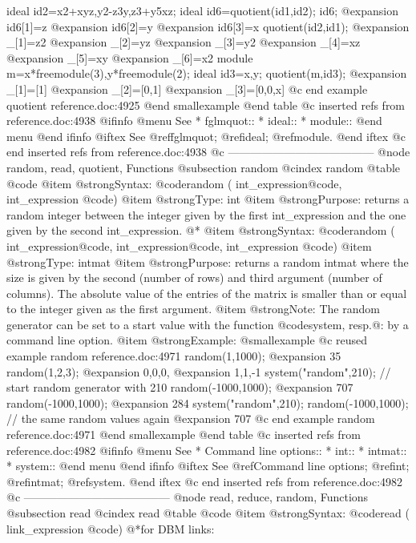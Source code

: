 {{{{{{ideal id2=x2+xyz,y2-z3y,z3+y5xz;
ideal id6=quotient(id1,id2);
id6;
@expansion{} id6[1]=z
@expansion{} id6[2]=y
@expansion{} id6[3]=x
quotient(id2,id1);
@expansion{} _[1]=z2
@expansion{} _[2]=yz
@expansion{} _[3]=y2
@expansion{} _[4]=xz
@expansion{} _[5]=xy
@expansion{} _[6]=x2
module m=x*freemodule(3),y*freemodule(2);
ideal id3=x,y;
quotient(m,id3);
@expansion{} _[1]=[1]
@expansion{} _[2]=[0,1]
@expansion{} _[3]=[0,0,x]
@c end example quotient reference.doc:4925
@end smallexample
@end table
@c inserted refs from reference.doc:4938
@ifinfo
@menu
See
* fglmquot::
* ideal::
* module::
@end menu
@end ifinfo
@iftex
See
@ref{fglmquot};
@ref{ideal};
@ref{module}.
@end iftex
@c end inserted refs from reference.doc:4938
@c ---------------------------------------
@node random, read, quotient, Functions
@subsection random
@cindex random
@table @code
@item @strong{Syntax:}
@code{random (} int_expression@code{,} int_expression @code{)}
@item @strong{Type:}
int
@item @strong{Purpose:}
returns a random integer between the integer given by the first
int_expression and the one given by the second int_expression.
@*
@item @strong{Syntax:}
@code{random (} int_expression@code{,} int_expression@code{,} int_expression @code{)}
@item @strong{Type:}
intmat
@item @strong{Purpose:}
returns a random intmat where the size is given by the second (number of
rows) and third argument (number of columns). The absolute value of the
entries of the matrix is smaller than or equal to the integer given as
the first argument.
@item @strong{Note:}
The random generator can be set to a start value with
the function @code{system}, resp.@: by a command line option.
@item @strong{Example:}
@smallexample
@c reused example random reference.doc:4971 
  random(1,1000);
@expansion{} 35
  random(1,2,3);
@expansion{} 0,0,0,
@expansion{} 1,1,-1 
  system("random",210);  // start random generator with 210
  random(-1000,1000);
@expansion{} 707
  random(-1000,1000);
@expansion{} 284
  system("random",210);
  random(-1000,1000);    // the same random values again
@expansion{} 707
@c end example random reference.doc:4971
@end smallexample
@end table
@c inserted refs from reference.doc:4982
@ifinfo
@menu
See
* Command line options::
* int::
* intmat::
* system::
@end menu
@end ifinfo
@iftex
See
@ref{Command line options};
@ref{int};
@ref{intmat};
@ref{system}.
@end iftex
@c end inserted refs from reference.doc:4982
@c ---------------------------------------
@node read, reduce, random, Functions
@subsection read
@cindex read
@table @code
@item @strong{Syntax:}
@code{read (} link_expression @code{)}
@*for DBM links:
}}}}}}
